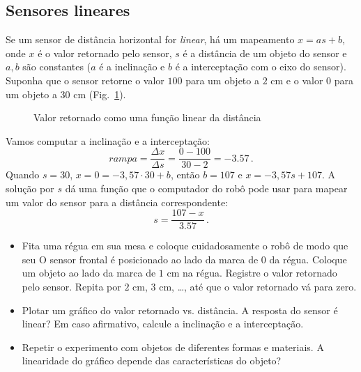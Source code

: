 {\subsection{Sensores lineares}

Se um sensor de distância horizontal for \emph{linear}, há um mapeamento $x = a s + b$, onde $x$ é o valor retornado pelo sensor, $s$ é a distância de um objeto do sensor e $a,b$ são constantes ($a$ é a inclinação e $b$ é a interceptação com o eixo do sensor). Suponha que o sensor retorne o valor $100$ para um objeto a $2$ cm e o valor $0$ para um objeto a $30$ cm (Fig.~\ref{fig.linear}).

\begin{figure}
\begin{center}
\caption{Valor retornado como uma função linear da distância}\label{fig.linear}
\end{center}
\end{figure}

Vamos computar a inclinação e a interceptação:
\[
\mathit{rampa} = \frac{\Delta x}{\Delta s} = \frac{0-100}{30-2}=-3.57\,.
\]
Quando $s=30$, $x=0=-3,57\cdot 30+b$, então $b=107$ e $x = -3,57 s + 107$. A solução por $s$ dá uma função que o computador do robô pode usar para mapear um valor do sensor para a distância correspondente:
\[
s = \frac{107-x}{3.57}\,.
\]

\begin{framed}
\begin{itemize}
\item Fita uma régua em sua mesa e coloque cuidadosamente o robô de modo que seu
O sensor frontal é posicionado ao lado da marca de $0$ da régua. Coloque um objeto ao lado da marca de $1$ cm na régua. Registre o valor retornado pelo sensor. Repita por $2$ cm, $3$ cm, \ldots, até que o valor retornado vá para zero.
\item Plotar um gráfico do valor retornado vs. distância. A resposta do sensor é linear? Em caso afirmativo, calcule a inclinação e a interceptação.
\item Repetir o experimento com objetos de diferentes formas e materiais. A linearidade do gráfico depende das características do objeto?
\end{itemize}
\end{framed}

}

